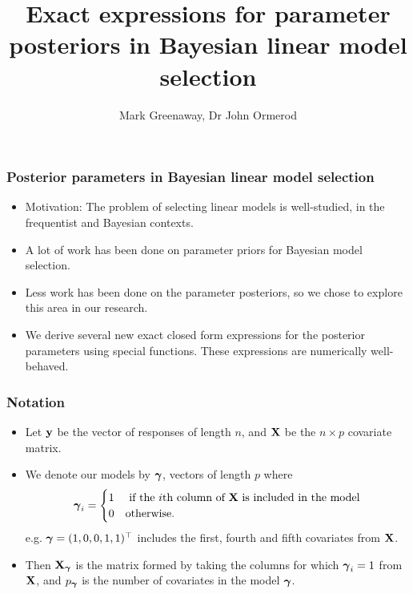 \documentclass[notes=only]{beamer}
\title{Exact expressions for parameter posteriors in Bayesian linear model selection}
\author{Mark Greenaway, Dr John Ormerod}
\begin{document}
\begin{frame}
	\titlepage
\end{frame}

			
\begin{frame}
	\frametitle{Posterior parameters in Bayesian linear model selection}
	\begin{itemize}
		\item Motivation: The problem of selecting linear models is well-studied, in the frequentist and Bayesian
					contexts.
		\item A lot of work has been done on parameter priors for Bayesian model selection.
		\item Less work has been done on the parameter posteriors, so we chose to explore this area in our
					research.
		\item We derive several new exact closed form expressions for the posterior parameters using special
					functions. These expressions are numerically well-behaved.
	\end{itemize}
\end{frame}


\begin{frame}
	\frametitle{Notation}
	\begin{itemize}
		\item Let ${\bf y}$ be the vector of responses of length $n$, and ${\bf X}$ be the $n \times p$ covariate matrix.
		\item We denote our models by ${\boldsymbol \gamma}$, vectors of length $p$ where
					\[
						{\boldsymbol \gamma}_i =
						\begin{cases}
							1 & \text{ if the $i$th column of ${\bf X}$ is included in the model} \\
							0 & \text{otherwise}.
						\end{cases}
					\]
		e.g. ${\boldsymbol \gamma} = (1, 0, 0, 1, 1)^\top$ includes the first, fourth and fifth covariates from ${\bf X}$.
		\item Then ${\bf X}_{\boldsymbol \gamma}$ is the matrix formed by taking the columns for which ${\boldsymbol \gamma}_i = 1$ from ${\bf X}$,
					and $p_{\boldsymbol \gamma}$ is the number of covariates in the model ${\boldsymbol \gamma}$.
	\end{itemize}
\end{frame}
\end{document}
